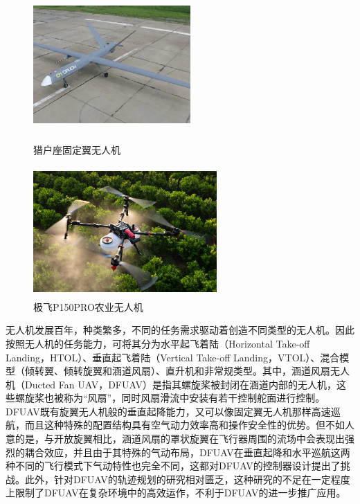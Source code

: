 \begin{figure}[htbp]
	\centering
	\begin{minipage}[c]{0.5\textwidth} %
		\centering
		\includegraphics[width=6cm,height=5cm]{Fig/Orion.jpg}
		\caption{\label{Orion}猎户座固定翼无人机}
	\end{minipage}%
	\begin{minipage}[c]{0.5\textwidth}
		\centering
		\includegraphics[width=7cm,height=5cm]{Fig/P150PRO.png}
		\caption{\label{P150PRO}极飞P150PRO农业无人机}
	\end{minipage}
\end{figure}

无人机发展百年，种类繁多，不同的任务需求驱动着创造不同类型的无人机。因此按照无人机的任务能力，可将其分为水平起飞着陆（Horizontal Take-off Landing，HTOL）、垂直起飞着陆（Vertical Take-off Landing，VTOL）、混合模型（倾转翼、倾转旋翼和涵道风扇）、直升机和非常规类型\cite{hassanalianClassificationsApplicationsDesign2017}。其中，涵道风扇无人机（Ducted Fan UAV，DFUAV）是指其螺旋桨被封闭在涵道内部的无人机，这些螺旋桨也被称为“风扇”，同时风扇滑流中安装有若干控制舵面进行控制。DFUAV既有旋翼无人机般的垂直起降能力，又可以像固定翼无人机那样高速巡航，而且这种特殊的配置结构具有空气动力效率高和操作安全性的优势\cite{johnsonModelingControlFlight2006b,choiStaticAnalysisSmall2012,zhangReviewDuctedFans2020b,qianImprovingPerformanceDucted2022,manzoor2022flight}。但不如人意的是，与开放旋翼相比，涵道风扇的罩状旋翼在飞行器周围的流场中会表现出强烈的耦合效应\cite{iiiNondimensionalModelingDuctedFan2012}，并且由于其特殊的气动布局，DFUAV在垂直起降和水平巡航这两种不同的飞行模式下气动特性也完全不同\cite{johnsonModelingControlFlight2006b}，这都对DFUAV的控制器设计提出了挑战。此外，针对DFUAV的轨迹规划的研究相对匮乏，这种研究的不足在一定程度上限制了DFUAV在复杂环境中的高效运作，不利于DFUAV的进一步推广应用。

